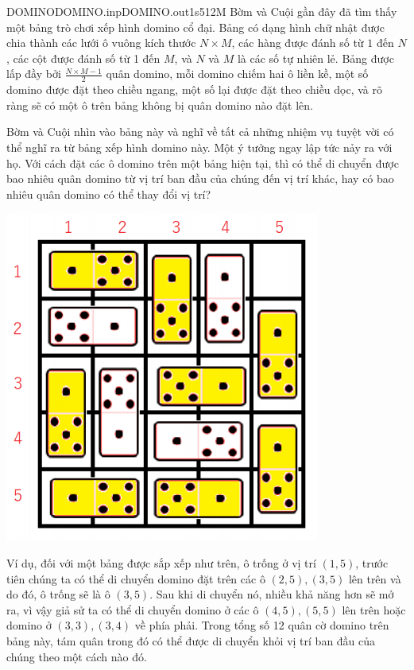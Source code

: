 \begin{problem}{DOMINO}{DOMINO.inp}{DOMINO.out}{1s}{512M}
Bờm và Cuội gần đây đã tìm thấy một bảng trò chơi xếp hình domino cổ đại. Bảng có dạng hình chữ nhật được chia thành các lưới ô vuông kích thước $N\times M$, các hàng được đánh số từ $1$ đến $N$, các cột được đánh số từ 1 đến $M$, và $N$ và $M$ là các số tự nhiên lẻ. Bảng được lấp đầy bởi $\frac{N \times M - 1}{2}$ quân domino, mỗi domino chiếm hai ô liền kề, một số domino được đặt theo chiều ngang, một số lại được đặt theo chiều dọc, và rõ ràng sẽ có một ô trên bảng không bị quân domino nào đặt lên.

Bờm và Cuội nhìn vào bảng này và nghĩ về tất cả những nhiệm vụ tuyệt vời có thể nghĩ ra từ bảng xếp hình domino này. Một ý tưởng ngay lập tức nảy ra với họ. Với cách đặt các ô domino trên một bảng hiện tại, thì có thể di chuyển được bao nhiêu quân domino từ vị trí ban đầu của chúng đến vị trí khác, hay có bao nhiêu quân domino có thể thay đổi vị trí?

\centerline{\includegraphics[totalheight=5cm]{domino/domino.PNG}}
    \label{fig:verticalcell}
    
Ví dụ, đối với một bảng được sắp xếp như trên, ô trống ở vị trí $(1,5)$, trước tiên chúng ta có thể di chuyển domino đặt trên các ô $(2,5), (3,5)$ lên trên và do đó, ô trống sẽ là ô $(3, 5)$. Sau khi di chuyển nó, nhiều khả năng hơn sẽ mở ra, vì vậy giả sử ta có thể di chuyển domino ở các ô $(4,5), (5,5)$ lên trên hoặc domino ở $(3,3), (3,4)$ về phía phải. 
Trong tổng số 12 quân cờ domino trên bảng này, tám quân trong đó có thể được di chuyển khỏi vị trí ban đầu của chúng theo một cách nào đó.


\end{problem}
